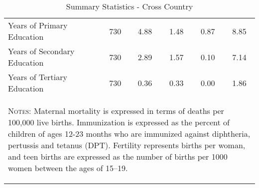 \begin{subtables}
\begin{table}[htpb!]
\begin{center}
\begin{tabular}{l c c c c c}
Years of Primary Education	&	730	&	4.88	&	1.48	&	0.87	&	8.85	\\
Years of Secondary Education	&	730	&	2.89	&	1.57	&	0.10	&	7.14	\\
Years of Tertiary Education	&	730	&	0.36	&	0.33	&	0.00	&	1.86	\\
\midrule											
\multicolumn{6}{p{12.5cm}}{\begin{footnotesize}\textsc{Notes:} Maternal mortality is expressed in terms of deaths per 100,000 live births. Immunization is expressed as the percent of children of ages 12-23 months who are immunized against diphtheria, pertussis and tetanus (DPT). Fertility represents births per woman, and teen births are expressed as the number of births per 1000 women between the ages of 15–19. \end{footnotesize}}  \\											
\bottomrule											
\end{tabular}											
\caption{Summary Statistics - Cross Country}											
\vspace{-6mm}											
\label{tab:sumstats}											
\end{center}											
\end{table}											



\end{subtables}
